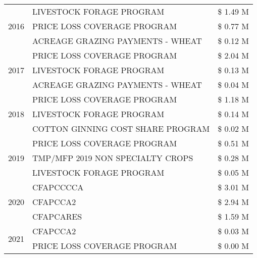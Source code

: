 \begin{tabular}{llr}
\cline{1-3}
\multirow[t]{3}{*}{2016} & LIVESTOCK FORAGE PROGRAM & \$ 1.49 M \\
 & PRICE LOSS COVERAGE PROGRAM & \$ 0.77 M \\
 & ACREAGE GRAZING PAYMENTS - WHEAT & \$ 0.12 M \\
\cline{1-3}
\multirow[t]{3}{*}{2017} & PRICE LOSS COVERAGE PROGRAM & \$ 2.04 M \\
 & LIVESTOCK FORAGE PROGRAM & \$ 0.13 M \\
 & ACREAGE GRAZING PAYMENTS - WHEAT & \$ 0.04 M \\
\cline{1-3}
\multirow[t]{3}{*}{2018} & PRICE LOSS COVERAGE PROGRAM & \$ 1.18 M \\
 & LIVESTOCK FORAGE PROGRAM & \$ 0.14 M \\
 & COTTON GINNING COST SHARE PROGRAM & \$ 0.02 M \\
\cline{1-3}
\multirow[t]{3}{*}{2019} & PRICE LOSS COVERAGE PROGRAM & \$ 0.51 M \\
 & TMP/MFP 2019 NON SPECIALTY CROPS & \$ 0.28 M \\
 & LIVESTOCK FORAGE PROGRAM & \$ 0.05 M \\
\cline{1-3}
\multirow[t]{3}{*}{2020} & CFAPCCCCA & \$ 3.01 M \\
 & CFAPCCA2 & \$ 2.94 M \\
 & CFAPCARES & \$ 1.59 M \\
\cline{1-3}
\multirow[t]{2}{*}{2021} & CFAPCCA2 & \$ 0.03 M \\
 & PRICE LOSS COVERAGE PROGRAM & \$ 0.00 M \\
\cline{1-3}
\bottomrule
\end{tabular}
